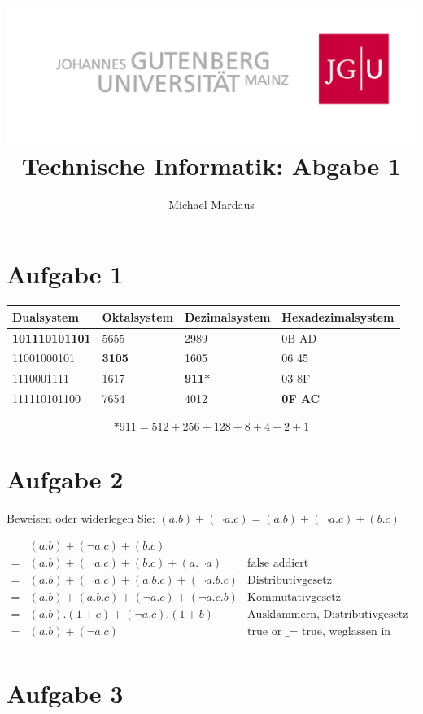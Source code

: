 \documentclass[10pt,a4paper]{scrartcl}
\author{Michael Mardaus}
\title{\includegraphics[scale=0.2]{../logo_schriftzug}\\ Technische Informatik:
Abgabe 1}
\begin{document}
\maketitle

\section{Aufgabe 1}

\begin{tabular}{|l|l|l|l|}\hline
Dualsystem & Oktalsystem & Dezimalsystem & Hexadezimalsystem \\\hline\hline
\textbf{101110101101} & 5655 & 2989 & 0B AD \\\hline
11001000101 & \textbf{3105} & 1605 & 06 45 \\\hline
1110001111 & 1617 & \textbf{911}$\ast$ & 03 8F \\\hline
111110101100 & 7654 & 4012 & \textbf{0F AC} \\\hline
\end{tabular}
\[\ast 911 = 512 + 256 + 128 + 8 + 4 + 2 + 1\] 
 

\section{Aufgabe 2}
Beweisen oder widerlegen Sie: $(a.b) + (\neg a.c) = (a.b) + (\neg a.c) + (b.c)$

\begin{eqnarray*}
& (a.b) + (\neg a.c) + (b.c) &\\
= & (a.b) + (\neg a.c) + (b.c) + (a.\neg a) & \text{false addiert}\\
= & (a.b) + (\neg a.c) + (a.b.c) + (\neg a.b.c) & \text{Distributivgesetz}\\
= & (a.b)  + (a.b.c)+ (\neg a.c) + (\neg a.c.b) & \text{Kommutativgesetz}\\
= & (a.b).(1 + c) + (\neg a.c).(1 + b) & \text{Ausklammern, Distributivgesetz}\\
= & (a.b) + (\neg a.c) & \text{true or \_ = true, weglassen in Produkt}\\
\end{eqnarray*}


\section{Aufgabe 3}
\end{document}

